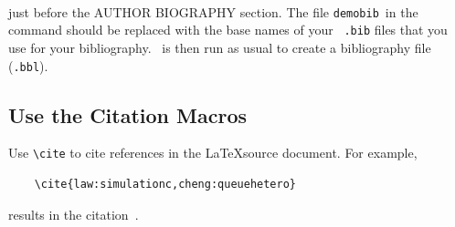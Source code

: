 \documentclass{scspaperproc}
\theoremstyle{scsthe}
\begin{document}
    \begin{verbatim}


    \end{verbatim}

    just before the AUTHOR BIOGRAPHY section.  The file \texttt{demobib}\ in the \verb++ command should be replaced with the base names of your \BibTeX\ \texttt{.bib} files that you use for your bibliography.  \BibTeX\ is then run as usual to create a bibliography file (\texttt{.bbl}).


    \subsection{Use the Citation Macros}

    Use \verb+\cite+ to cite references in the \LaTeX source document. For example,

    \begin{verbatim}
    \cite{law:simulationc,cheng:queuehetero}
    \end{verbatim} %

    results in the citation~\cite{law:simulationc,cheng:queuehetero}.







\end{document}
